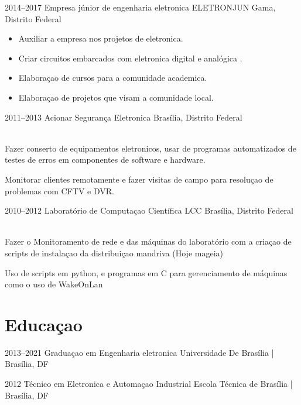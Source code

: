 \documentclass[]{cv-style}          %
\begin{document}
\begin{entrylist}
{  }
  
  \entry
  {2014--2017}
  {Empresa júnior de engenharia eletronica ELETRONJUN}
  {Gama, Distrito Federal}
  {
   \begin{itemize}
    \item Auxiliar a empresa nos projetos de eletronica. 
    \item Criar circuitos embarcados com eletronica digital e analógica .
    \item Elaboraçao de cursos para a comunidade academica.
    \item Elaboraçao de projetos que visam a comunidade local.
   \end{itemize}
  }
  
  \entry
  {2011--2013}
  {Acionar Segurança Eletronica}
  {Brasília, Distrito Federal}
  {\\
  Fazer conserto de equipamentos eletronicos, usar de programas automatizados de testes de erros em componentes de software e hardware. 
  
  Monitorar clientes remotamente e fazer visitas de campo para resoluçao de problemas com CFTV e DVR. 
  }
  
  \entry
  {2010--2012}
  {Laboratório de Computaçao Científica LCC}
  {Brasília, Distrito Federal}
  {\\
  Fazer o Monitoramento de rede e das máquinas do laboratório com a criaçao de scripts de instalaçao da distribuiçao mandriva (Hoje mageia)
  
  Uso de scripts em python, e programas em C para gerenciamento de máquinas como o uso de WakeOnLan  
  
  }


\end{entrylist}


\section{Educaçao}

\begin{entrylist}
\entry
{2013--2021}
{Graduaçao {\normalfont em Engenharia eletronica }}
{Universidade De Brasília  |  Brasília, DF}
{\vspace{-0.3cm}}

\entry
{2012}
{Técnico {\normalfont em Eletronica e Automaçao Industrial }}
{Escola Técnica de Brasília  |  Brasília, DF}
{\vspace{-0.3cm}}


\end{entrylist}
\end{document}
